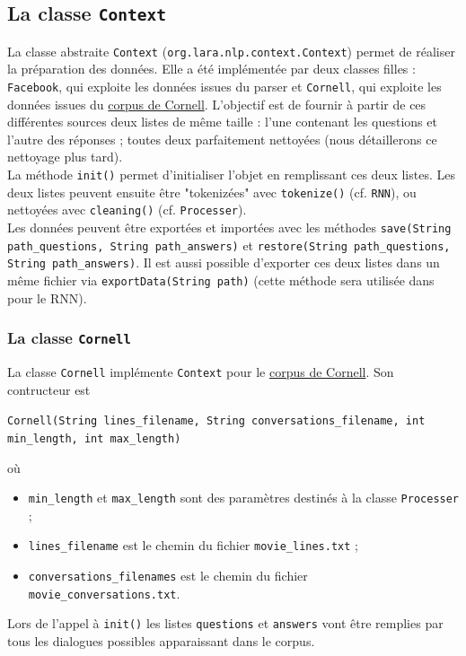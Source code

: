 \documentclass[10pt,a4paper]{article}
\newcommand\tab[1][0.5cm]{\hspace*{#1}}
\begin{document}
\subsection{La classe \texttt{Context}}
La classe abstraite \texttt{Context} (\texttt{org.lara.nlp.context.Context}) permet de réaliser la préparation des données. Elle a été implémentée par deux classes filles : \texttt{Facebook}, qui exploite les données issues du parser et \texttt{Cornell}, qui exploite les données issues du \href{https://www.cs.cornell.edu/~cristian/Cornell_Movie-Dialogs_Corpus.html}{corpus de Cornell}. L'objectif est de fournir à partir de ces différentes sources deux listes de même taille : l'une contenant les questions et l'autre des réponses ; toutes deux parfaitement nettoyées (nous détaillerons ce nettoyage plus tard). \\
\tab La méthode \texttt{init()} permet d'initialiser l'objet en remplissant ces deux listes. Les deux listes peuvent ensuite être "tokenizées" avec \texttt{tokenize()} (cf. \texttt{RNN}), ou nettoyées avec \texttt{cleaning()} (cf. \texttt{Processer}). \\
\tab Les données peuvent être exportées et importées avec les méthodes \texttt{save(String path\_questions, String path\_answers)} et \texttt{restore(String path\_questions, String path\_answers)}. Il est aussi possible d'exporter ces deux listes dans un même fichier via \texttt{exportData(String path)} (cette méthode sera utilisée dans pour le RNN).

\subsubsection{La classe \texttt{Cornell}}
La classe \texttt{Cornell} implémente \texttt{Context} pour le \href{https://www.cs.cornell.edu/~cristian/Cornell_Movie-Dialogs_Corpus.html}{corpus de Cornell}. Son contructeur est
\begin{center}
	\texttt{Cornell(String lines\_filename, String conversations\_filename, int min\_length, int max\_length)}
\end{center}
où
\begin{itemize}
	\item \texttt{min\_length} et \texttt{max\_length} sont des paramètres destinés à la classe \texttt{Processer} ;
	\item \texttt{lines\_filename} est le chemin du fichier \texttt{movie\_lines.txt} ;
	\item \texttt{conversations\_filenames} est le chemin du fichier \texttt{movie\_conversations.txt}.
\end{itemize}
\tab Lors de l'appel à \texttt{init()} les listes \texttt{questions} et \texttt{answers} vont être remplies par tous les dialogues possibles apparaissant dans le corpus.
\end{document}
